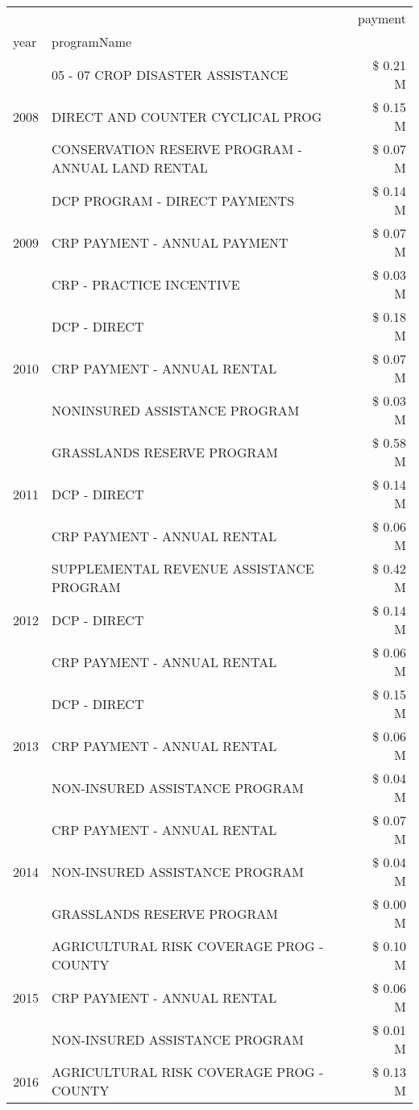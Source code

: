 \begin{tabular}{llr}
\toprule
 &  & payment \\
year & programName &  \\
\midrule
\multirow[t]{3}{*}{2008} & 05 - 07 CROP DISASTER ASSISTANCE & \$ 0.21 M \\
 & DIRECT AND COUNTER CYCLICAL PROG & \$ 0.15 M \\
 & CONSERVATION RESERVE PROGRAM - ANNUAL LAND RENTAL & \$ 0.07 M \\
\cline{1-3}
\multirow[t]{3}{*}{2009} & DCP PROGRAM - DIRECT PAYMENTS & \$ 0.14 M \\
 & CRP PAYMENT - ANNUAL PAYMENT & \$ 0.07 M \\
 & CRP - PRACTICE INCENTIVE & \$ 0.03 M \\
\cline{1-3}
\multirow[t]{3}{*}{2010} & DCP - DIRECT & \$ 0.18 M \\
 & CRP PAYMENT - ANNUAL RENTAL & \$ 0.07 M \\
 & NONINSURED ASSISTANCE PROGRAM & \$ 0.03 M \\
\cline{1-3}
\multirow[t]{3}{*}{2011} & GRASSLANDS RESERVE PROGRAM & \$ 0.58 M \\
 & DCP - DIRECT & \$ 0.14 M \\
 & CRP PAYMENT - ANNUAL RENTAL & \$ 0.06 M \\
\cline{1-3}
\multirow[t]{3}{*}{2012} & SUPPLEMENTAL REVENUE ASSISTANCE PROGRAM & \$ 0.42 M \\
 & DCP - DIRECT & \$ 0.14 M \\
 & CRP PAYMENT - ANNUAL RENTAL & \$ 0.06 M \\
\cline{1-3}
\multirow[t]{3}{*}{2013} & DCP - DIRECT & \$ 0.15 M \\
 & CRP PAYMENT - ANNUAL RENTAL & \$ 0.06 M \\
 & NON-INSURED ASSISTANCE PROGRAM & \$ 0.04 M \\
\cline{1-3}
\multirow[t]{3}{*}{2014} & CRP PAYMENT - ANNUAL RENTAL & \$ 0.07 M \\
 & NON-INSURED ASSISTANCE PROGRAM & \$ 0.04 M \\
 & GRASSLANDS RESERVE PROGRAM & \$ 0.00 M \\
\cline{1-3}
\multirow[t]{3}{*}{2015} & AGRICULTURAL RISK COVERAGE PROG - COUNTY & \$ 0.10 M \\
 & CRP PAYMENT - ANNUAL RENTAL & \$ 0.06 M \\
 & NON-INSURED ASSISTANCE PROGRAM & \$ 0.01 M \\
\cline{1-3}
\multirow[t]{3}{*}{2016} & AGRICULTURAL RISK COVERAGE PROG - COUNTY & \$ 0.13 M \\

\end{tabular}

